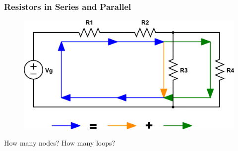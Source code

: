 \documentclass{beamer}
\begin{document}
\begin{frame}
\frametitle{Resistors in Series and Parallel}
\begin{figure}
\includegraphics[scale=0.40]{fig/SP.png} 
\end{figure}

\vspace{0.25cm}

How many nodes? How many loops?

\end{frame}
\end{document}
